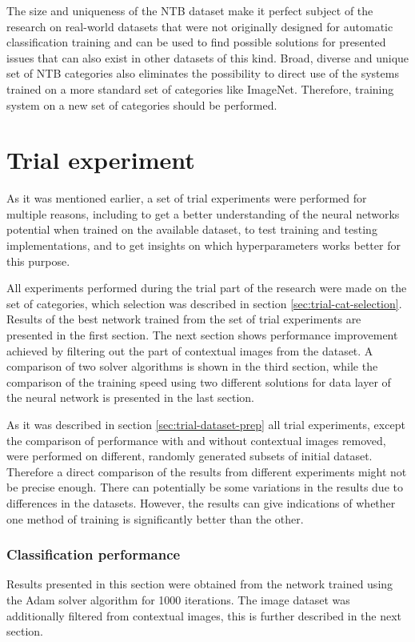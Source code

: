 The size and uniqueness of the NTB dataset make it perfect subject of the research on real-world datasets that were not originally designed for automatic classification training and can be used to find possible solutions for presented issues that can also exist in other datasets of this kind. Broad, diverse and unique set of NTB categories also eliminates the possibility to direct use of the systems trained on a more standard set of categories like ImageNet. Therefore, training system on a new set of categories should be performed.


\section{Trial experiment}
As it was mentioned earlier, a set of trial experiments were performed for multiple reasons, including to get a better understanding of the neural networks potential when trained on the available dataset, to test training and testing implementations, and to get insights on which hyperparameters works better for this purpose.

All experiments performed during the trial part of the research were made on the set of categories, which selection was described in section \ref{sec:trial-cat-selection}. Results of the best network trained from the set of trial experiments are presented in the first section. The next section shows performance improvement achieved by filtering out the part of contextual images from the dataset. A comparison of two solver algorithms is shown in the third section, while the comparison of the training speed using two different solutions for data layer of the neural network is presented in the last section.

As it was described in section \ref{sec:trial-dataset-prep} all trial experiments, except the comparison of performance with and without contextual images removed, were performed on different, randomly generated subsets of initial dataset. Therefore a direct comparison of the results from different experiments might not be precise enough. There can potentially be some variations in the results due to differences in the datasets. However, the results can give indications of whether one method of training is significantly better than the other.

\subsubsection{Classification performance}
    Results presented in this section were obtained from the network trained using the Adam solver algorithm for 1000 iterations. The image dataset was additionally filtered from contextual images, this is further described in the next section.
    
